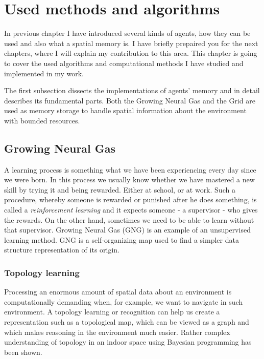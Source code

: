 \chapter{Used methods and algorithms}

In previous chapter I have introduced several kinds of agents, how they can be used and also what a spatial memory is. I have briefly prepaired you for the next chapters, where I will explain my contribution to this area. This chapter is going to cover the used algorithms and computational methods I have studied and implemented in my work. 

The first subsection dissects the implementations of agents' memory and in detail describes its fundamental parts. Both the Growing Neural Gas and the Grid are used as memory storage to handle spatial information about the environment with bounded resources.

\section{Growing Neural Gas}   
\label{usedalgo:gng}

A learning process is something what we have been experiencing every day since we were born. In this process we usually know whether we have mastered a new skill by trying it and being rewarded. Either at school, or at work. Such a procedure, whereby someone is rewarded or punished after he does something, is called a \emph{reinforcement learning} and it expects someone - a supervisor - who gives the rewards. On the other hand, sometimes we need to be able to learn without that supervisor. Growing Neural Gas (GNG) is an example of an unsupervised learning method. GNG is a self-organizing map used to find a simpler data structure representation of its origin.

\subsection{Topology learning}

Processing an enormous amount of spatial data about an environment is computationally demanding when, for example, we want to navigate in such environment. A topology learning or recognition can help us create a representation such as a topological map, which can be viewed as a graph and which makes reasoning in the environment much easier. Rather complex understanding of topology in an indoor space using Bayesian programming has been shown. \cite{Tapus:topologylearning}  

